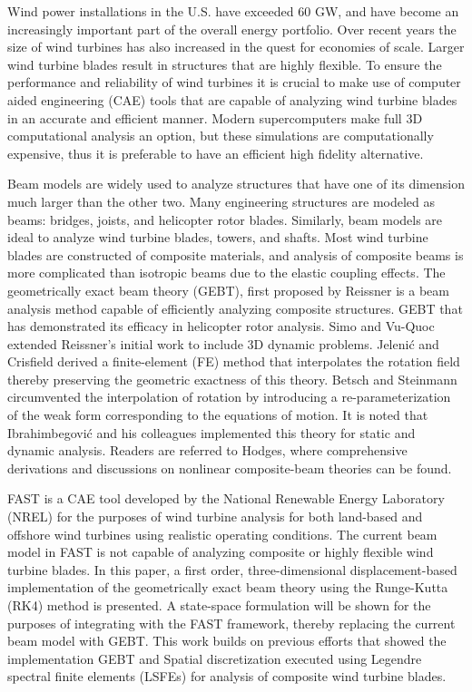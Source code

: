 \documentclass{article}
\begin{document}
Wind power installations in the U.S. have exceeded 60 GW, and have become an increasingly important part of the overall energy portfolio. Over recent years the size of wind turbines has also increased in the quest for economies of scale.  Larger wind turbine blades result in structures that are highly flexible.  To ensure the performance and reliability of wind turbines it is crucial to make use of computer aided engineering (CAE) tools that are capable of analyzing wind turbine blades in an accurate and efficient manner.  Modern supercomputers make full 3D computational analysis an option, but these simulations are computationally expensive, thus it is preferable to have an efficient high fidelity alternative.  

Beam models are widely used to analyze structures that have one of its dimension much larger than the other two.  Many engineering structures are modeled as beams: bridges, joists, and helicopter rotor blades. Similarly, beam models are ideal to analyze wind turbine blades, towers, and shafts.  Most wind turbine blades are constructed of composite materials, and analysis of composite beams is more complicated than isotropic beams due to the elastic coupling effects.  The geometrically exact beam theory (GEBT), first proposed by Reissner\cite{Ressiner1973} is a beam analysis method capable of efficiently analyzing composite structures.  GEBT that has demonstrated its efficacy in helicopter rotor analysis. Simo\cite{Simo1985} and Vu-Quoc\cite{Simo1986} extended Reissner's initial work to include 3D dynamic problems. Jeleni\'c and Crisfield\cite{Crisfield1999} derived a finite-element (FE) method that interpolates the rotation field thereby preserving the geometric exactness of this theory. Betsch and Steinmann\cite{Betsch2002} circumvented the interpolation of rotation by introducing a re-parameterization of the weak form corresponding to the equations of motion. It is noted that Ibrahimbegovi\'c and his colleagues implemented this theory for static\cite{Ibrahim1995} and dynamic\cite{Ibrahim1998} analysis. Readers are referred to Hodges\cite{HodgesBeamBook}, where comprehensive derivations and discussions on nonlinear composite-beam theories can be found.  

FAST is a CAE tool developed by the National Renewable Energy Laboratory (NREL) for the purposes of wind turbine analysis for both land-based and offshore wind turbines using realistic operating conditions.  The current beam model in FAST is not capable of analyzing composite or highly flexible wind turbine blades. In this paper, a first order, three-dimensional displacement-based implementation of the geometrically exact beam theory using the Runge-Kutta (RK4) method is presented. A state-space formulation will be shown for the purposes of integrating with the FAST framework, thereby replacing the current beam model with GEBT. This work builds on previous efforts that showed the implementation GEBT and Spatial discretization executed using Legendre spectral finite elements (LSFEs)\cite{Wang:GEBT2014} for analysis of composite wind turbine blades. 
\end{document}
